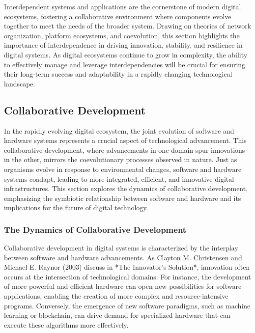 \documentclass[12pt,twoside]{article}
\begin{document}
Interdependent systems and applications are the cornerstone of modern digital ecosystems, fostering a collaborative environment where components evolve together to meet the needs of the broader system. Drawing on theories of network organization, platform ecosystems, and coevolution, this section highlights the importance of interdependence in driving innovation, stability, and resilience in digital systems. As digital ecosystems continue to grow in complexity, the ability to effectively manage and leverage interdependencies will be crucial for ensuring their long-term success and adaptability in a rapidly changing technological landscape.

\subsection{Collaborative Development}

In the rapidly evolving digital ecosystem, the joint evolution of software and hardware systems represents a crucial aspect of technological advancement. This collaborative development, where advancements in one domain spur innovations in the other, mirrors the coevolutionary processes observed in nature. Just as organisms evolve in response to environmental changes, software and hardware systems coadapt, leading to more integrated, efficient, and innovative digital infrastructures. This section explores the dynamics of collaborative development, emphasizing the symbiotic relationship between software and hardware and its implications for the future of digital technology.

\subsubsection{The Dynamics of Collaborative Development}

Collaborative development in digital systems is characterized by the interplay between software and hardware advancements. As Clayton M. Christensen and Michael E. Raynor (2003) discuss in *The Innovator's Solution*, innovation often occurs at the intersection of technological domains. For instance, the development of more powerful and efficient hardware can open new possibilities for software applications, enabling the creation of more complex and resource-intensive programs. Conversely, the emergence of new software paradigms, such as machine learning or blockchain, can drive demand for specialized hardware that can execute these algorithms more effectively.
\end{document}
